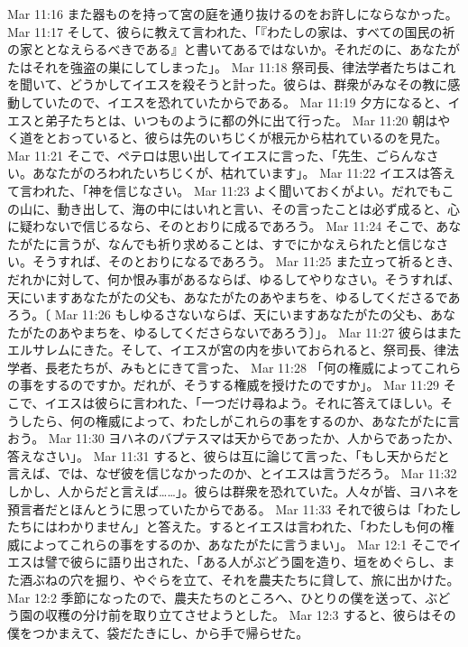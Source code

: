 Mar 11:16  また器ものを持って宮の庭を通り抜けるのをお許しにならなかった。
Mar 11:17  そして、彼らに教えて言われた、「『わたしの家は、すべての国民の祈の家ととなえらるべきである』と書いてあるではないか。それだのに、あなたがたはそれを強盗の巣にしてしまった」。
Mar 11:18  祭司長、律法学者たちはこれを聞いて、どうかしてイエスを殺そうと計った。彼らは、群衆がみなその教に感動していたので、イエスを恐れていたからである。
Mar 11:19  夕方になると、イエスと弟子たちとは、いつものように都の外に出て行った。
Mar 11:20  朝はやく道をとおっていると、彼らは先のいちじくが根元から枯れているのを見た。
Mar 11:21  そこで、ペテロは思い出してイエスに言った、「先生、ごらんなさい。あなたがのろわれたいちじくが、枯れています」。
Mar 11:22  イエスは答えて言われた、「神を信じなさい。
Mar 11:23  よく聞いておくがよい。だれでもこの山に、動き出して、海の中にはいれと言い、その言ったことは必ず成ると、心に疑わないで信じるなら、そのとおりに成るであろう。
Mar 11:24  そこで、あなたがたに言うが、なんでも祈り求めることは、すでにかなえられたと信じなさい。そうすれば、そのとおりになるであろう。
Mar 11:25  また立って祈るとき、だれかに対して、何か恨み事があるならば、ゆるしてやりなさい。そうすれば、天にいますあなたがたの父も、あなたがたのあやまちを、ゆるしてくださるであろう。〔
Mar 11:26  もしゆるさないならば、天にいますあなたがたの父も、あなたがたのあやまちを、ゆるしてくださらないであろう〕」。
Mar 11:27  彼らはまたエルサレムにきた。そして、イエスが宮の内を歩いておられると、祭司長、律法学者、長老たちが、みもとにきて言った、
Mar 11:28  「何の権威によってこれらの事をするのですか。だれが、そうする権威を授けたのですか」。
Mar 11:29  そこで、イエスは彼らに言われた、「一つだけ尋ねよう。それに答えてほしい。そうしたら、何の権威によって、わたしがこれらの事をするのか、あなたがたに言おう。
Mar 11:30  ヨハネのバプテスマは天からであったか、人からであったか、答えなさい」。
Mar 11:31  すると、彼らは互に論じて言った、「もし天からだと言えば、では、なぜ彼を信じなかったのか、とイエスは言うだろう。
Mar 11:32  しかし、人からだと言えば……」。彼らは群衆を恐れていた。人々が皆、ヨハネを預言者だとほんとうに思っていたからである。
Mar 11:33  それで彼らは「わたしたちにはわかりません」と答えた。するとイエスは言われた、「わたしも何の権威によってこれらの事をするのか、あなたがたに言うまい」。
Mar 12:1  そこでイエスは譬で彼らに語り出された、「ある人がぶどう園を造り、垣をめぐらし、また酒ぶねの穴を掘り、やぐらを立て、それを農夫たちに貸して、旅に出かけた。
Mar 12:2  季節になったので、農夫たちのところへ、ひとりの僕を送って、ぶどう園の収穫の分け前を取り立てさせようとした。
Mar 12:3  すると、彼らはその僕をつかまえて、袋だたきにし、から手で帰らせた。
